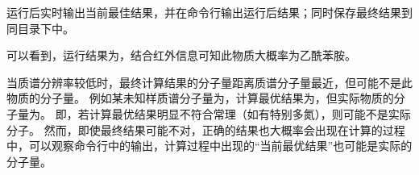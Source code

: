 运行后实时输出当前最佳结果，并在命令行输出运行后结果；同时保存最终结果到同目录下中。

可以看到，运行结果为，结合红外信息可知此物质大概率为乙酰苯胺。

当质谱分辨率较低时，最终计算结果的分子量距离质谱分子量最近，但可能不是此物质的分子量。
例如某未知样质谱分子量为，计算最优结果为，但实际物质的分子量为。
即，若计算最优结果明显不符合常理（如有特别多氮），则可能不是实际分子。
然而，即使最终结果可能不对，正确的结果也大概率会出现在计算的过程中，可以观察命令行中的输出，计算过程中出现的“当前最优结果”也可能是实际的分子量。